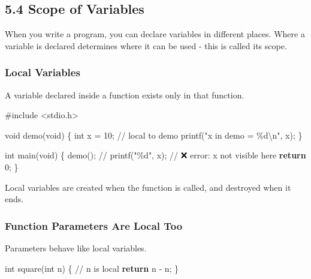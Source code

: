 \documentclass[
  letterpaper,
  DIV=11,
  numbers=noendperiod]{scrreprt}
\newenvironment{Shaded}{\begin{snugshade}}{\end{snugshade}}
\newcommand{\CommentTok}[1]{\textcolor[rgb]{0.37,0.37,0.37}{#1}}
\newcommand{\ControlFlowTok}[1]{\textcolor[rgb]{0.00,0.23,0.31}{\textbf{#1}}}
\newcommand{\DataTypeTok}[1]{\textcolor[rgb]{0.68,0.00,0.00}{#1}}
\newcommand{\DecValTok}[1]{\textcolor[rgb]{0.68,0.00,0.00}{#1}}
\newcommand{\ImportTok}[1]{\textcolor[rgb]{0.00,0.46,0.62}{#1}}
\newcommand{\NormalTok}[1]{\textcolor[rgb]{0.00,0.23,0.31}{#1}}
\newcommand{\OperatorTok}[1]{\textcolor[rgb]{0.37,0.37,0.37}{#1}}
\newcommand{\PreprocessorTok}[1]{\textcolor[rgb]{0.68,0.00,0.00}{#1}}
\newcommand{\SpecialCharTok}[1]{\textcolor[rgb]{0.37,0.37,0.37}{#1}}
\newcommand{\StringTok}[1]{\textcolor[rgb]{0.13,0.47,0.30}{#1}}
\begin{document}
\subsection{5.4 Scope of Variables}\label{scope-of-variables}

When you write a program, you can declare variables in different places.
Where a variable is declared determines where it can be used - this is
called its scope.

\subsubsection{Local Variables}\label{local-variables}

A variable declared inside a function exists only in that function.

\begin{Shaded}
\begin{Highlighting}[]
\PreprocessorTok{\#include }\ImportTok{\textless{}stdio.h\textgreater{}}

\DataTypeTok{void}\NormalTok{ demo}\OperatorTok{(}\DataTypeTok{void}\OperatorTok{)} \OperatorTok{\{}
    \DataTypeTok{int}\NormalTok{ x }\OperatorTok{=} \DecValTok{10}\OperatorTok{;}   \CommentTok{// local to demo}
\NormalTok{    printf}\OperatorTok{(}\StringTok{"x in demo = }\SpecialCharTok{\%d\textbackslash{}n}\StringTok{"}\OperatorTok{,}\NormalTok{ x}\OperatorTok{);}
\OperatorTok{\}}

\DataTypeTok{int}\NormalTok{ main}\OperatorTok{(}\DataTypeTok{void}\OperatorTok{)} \OperatorTok{\{}
\NormalTok{    demo}\OperatorTok{();}
    \CommentTok{// printf("\%d", x);  // ❌ error: x not visible here}
    \ControlFlowTok{return} \DecValTok{0}\OperatorTok{;}
\OperatorTok{\}}
\end{Highlighting}
\end{Shaded}

Local variables are created when the function is called, and destroyed
when it ends.

\subsubsection{Function Parameters Are Local
Too}\label{function-parameters-are-local-too}

Parameters behave like local variables.

\begin{Shaded}
\begin{Highlighting}[]
\DataTypeTok{int}\NormalTok{ square}\OperatorTok{(}\DataTypeTok{int}\NormalTok{ n}\OperatorTok{)} \OperatorTok{\{}   \CommentTok{// n is local}
    \ControlFlowTok{return}\NormalTok{ n }\OperatorTok{{-}}\NormalTok{ n}\OperatorTok{;}
\OperatorTok{\}}
\end{Highlighting}
\end{Shaded}
\end{document}
